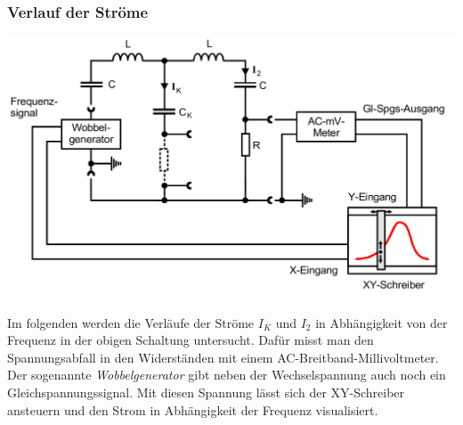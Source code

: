 \subsubsection*{Verlauf der Ströme}

\includegraphics[width=\textwidth]{pictures/stromkurven.png}

Im folgenden werden die Verläufe der Ströme $I_{K}$ und $I_{2}$ in Abhängigkeit von der Frequenz
in der obigen Schaltung untersucht.
Dafür misst man den Spannungsabfall in den Widerständen mit einem AC-Breitband-Millivoltmeter.
Der sogenannte \textit{Wobbelgenerator} gibt neben der Wechselspannung auch noch ein Gleichspannungssignal.
Mit diesen Spannung lässt sich der XY-Schreiber ansteuern und  den Strom in Abhängigkeit der Frequenz visualisiert.
    